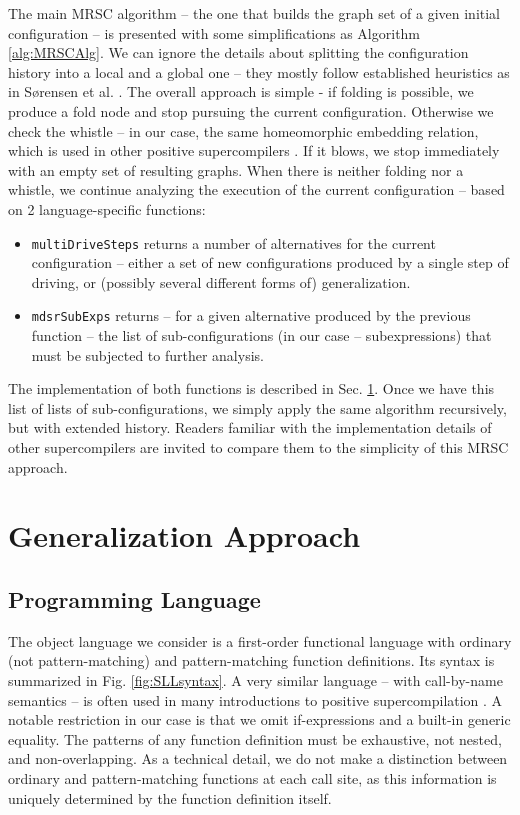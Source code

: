 \documentclass[submission,copyright,creativecommons]{eptcs}
\begin{document}
The main MRSC algorithm -- the one that builds the graph set of a given initial
configuration -- is presented with some simplifications as Algorithm \ref{alg:MRSCAlg}.
We can ignore the details about splitting the configuration history into a local
and a global one -- they mostly follow established heuristics as in S{\o}rensen et al. 
\cite{Sorensen1994TurchinSupercompiler,sorm98b}.
The overall approach is simple - if folding is possible, we produce a fold node 
and stop pursuing the current configuration.
Otherwise we check the whistle -- in our case, the same homeomorphic embedding relation,
which is used in other positive supercompilers \cite{sorm98b}.
If it blows, we stop immediately with an empty set of resulting graphs.
When there is neither folding nor a whistle, we continue analyzing the execution of the
current configuration -- based on 2 language-specific functions:
\begin{itemize}
  \item \verb|multiDriveSteps| returns a number of alternatives for the current configuration --
    either a set of new configurations produced by a single step of driving, 
    or (possibly several different forms of) generalization.
  \item \verb|mdsrSubExps| returns -- for a given alternative produced by the previous function --
    the list of sub-configurations (in our case -- subexpressions) that must be subjected
    to further analysis.
\end{itemize}
The implementation of both functions is described in Sec. \ref{sec:Generalize}.
Once we have this list of lists of sub-configurations, we simply apply the same
algorithm recursively, but with extended history.
Readers familiar with the implementation details of other supercompilers are
invited to compare them to the simplicity of this MRSC approach.

\section{Generalization Approach}\label{sec:Generalize}

\subsection{Programming Language}

The object language we consider is a first-order functional language with ordinary (not pattern-matching) and 
pattern-matching function definitions.
Its syntax is summarized in Fig. \ref{fig:SLLsyntax}.
A very similar language -- with call-by-name semantics -- is often used in many introductions to positive
supercompilation \cite{Sorensen1994TurchinSupercompiler,sorm98b,TMR/SCP2014}.
A notable restriction in our case is that we omit if-expressions and a built-in generic equality.
The patterns of any function definition must be exhaustive, not nested, and non-overlapping.
As a technical detail, we do not make a distinction between ordinary and pattern-matching functions
at each call site, as this information is uniquely determined by the function definition itself.
\end{document}
